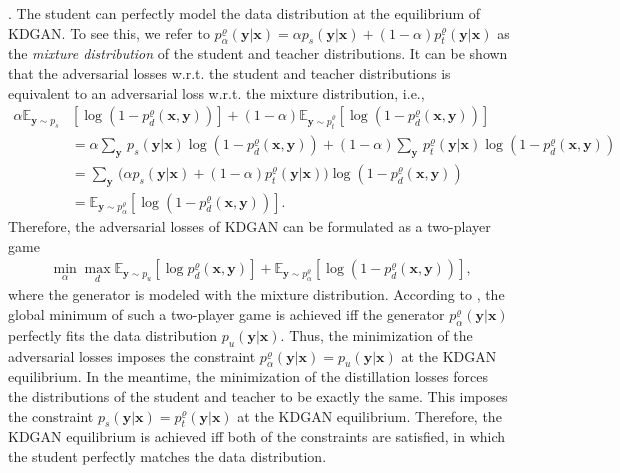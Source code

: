 \documentclass{article}
\newcommand{\OVEC}[1]{\bm{#1}} %
\newcommand{\EXP}{\mathbb{E}} %
\newcommand{\abbrpdat}{p_{u}}
\newcommand{\fullpdat}{p_{u}(\OVEC{y}|\OVEC{x})}
\newcommand{\abbrpstd}{p_{s}}
\newcommand{\fullpstd}[1]{p_{s}(#1|\OVEC{x})}
\newcommand{\abbrptch}{p_{t}^{\varrho}}
\newcommand{\fullptch}[1]{p_{t}^{\varrho}(#1|\OVEC{x})}
\newcommand{\fullpdis}[1]{p_{d}^{\varrho}(\OVEC{x},#1)}
\newcommand{\abbrpmix}{p_{\alpha}^{\varrho}}
\newcommand{\fullpmix}{p_{\alpha}^{\varrho}(\OVEC{y}|\OVEC{x})}
\begin{document}
.
The student can perfectly model the data distribution at the equilibrium of KDGAN.
To see this, we refer to $\fullpmix=\alpha\fullpstd{\OVEC{y}}+(1-\alpha)\fullptch{\OVEC{y}}$ as the \emph{mixture distribution} of the student and teacher distributions.
It can be shown that the adversarial losses w.r.t. the student and teacher distributions is equivalent to an adversarial loss w.r.t. the mixture distribution, i.e.,
\begin{equation}
\begin{aligned}
\alpha\EXP_{\OVEC{y}\sim\abbrpstd}
&
[\log(1-\fullpdis{\OVEC{y}})]
+
(1-\alpha)\EXP_{\OVEC{y}\sim\abbrptch}[\log(1-\fullpdis{\OVEC{y}})]
\\
&=
\alpha{\textstyle\sum}_{\OVEC{y}}\,
\fullpstd{\OVEC{y}}\log(1-\fullpdis{\OVEC{y}})
+
(1-\alpha){\textstyle\sum}_{\OVEC{y}}\,
\fullptch{\OVEC{y}}\log(1-\fullpdis{\OVEC{y}})
\\
&=
{\textstyle\sum}_{\OVEC{y}}\,
\big(\alpha\fullpstd{\OVEC{y}}+(1-\alpha)\fullptch{\OVEC{y}}\big)
\log(1-\fullpdis{\OVEC{y}})
\\
&=
\EXP_{\OVEC{y}\sim\abbrpmix}[\log(1-\fullpdis{\OVEC{y}})]
\text{.}
\end{aligned}
\end{equation}
Therefore, the adversarial losses of KDGAN can be formulated as a two-player game 
\begin{equation}
\begin{aligned}
\min_{\alpha}
\max_{d}
\EXP_{\OVEC{y}\sim\abbrpdat}[\log\fullpdis{\OVEC{y}}]
+
\EXP_{\OVEC{y}\sim\abbrpmix}[\log(1-\fullpdis{\OVEC{y}})]
\text{,}
\end{aligned}
\end{equation}%
where the generator is modeled with the mixture distribution.
According to \cite{wang2017irgan}, the global minimum of such a two-player game is achieved iff the generator $\fullpmix$ perfectly fits the data distribution $\fullpdat$.
Thus, the minimization of the adversarial losses imposes the constraint $\fullpmix=\fullpdat$ at the KDGAN equilibrium.
In the meantime, the minimization of the distillation losses forces the distributions of the student and teacher to be exactly the same.
This imposes the constraint $\fullpstd{\OVEC{y}}=\fullptch{\OVEC{y}}$ at the KDGAN equilibrium.
Therefore, the KDGAN equilibrium is achieved iff both of the constraints are satisfied, in which the student perfectly matches the data distribution.
\end{document}
